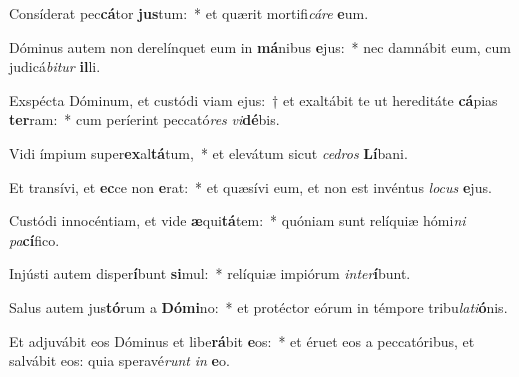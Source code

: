\item Consíderat pec\textbf{cá}tor \textbf{jus}tum:~* et quærit mortifi\textit{cá}\textit{re} \textbf{e}um.
\item Dóminus autem non derelínquet eum in \textbf{má}nibus \textbf{e}jus:~* nec damnábit eum, cum judicá\textit{bi}\textit{tur} \textbf{il}li.
\item Exspécta Dóminum, et custódi viam ejus:~† et exaltábit te ut hereditáte \textbf{cá}pias \textbf{ter}ram:~* cum períerint peccató\textit{res} \textit{vi}\textbf{dé}bis.
\item Vidi ímpium super\textbf{ex}al\textbf{tá}tum,~* et elevátum sicut \textit{ce}\textit{dros} \textbf{Lí}bani.
\item Et transívi, et \textbf{ec}ce non \textbf{e}rat:~* et quæsívi eum, et non est invéntus \textit{lo}\textit{cus} \textbf{e}jus.
\item Custódi innocéntiam, et vide \textbf{æ}qui\textbf{tá}tem:~* quóniam sunt relíquiæ hómi\textit{ni} \textit{pa}\textbf{cí}fico.
\item Injústi autem disper\textbf{í}bunt \textbf{si}mul:~* relíquiæ impiórum \textit{in}\textit{ter}\textbf{í}bunt.
\item Salus autem jus\textbf{tó}rum a \textbf{Dó}\textbf{mi}no:~* et protéctor eórum in témpore tribu\textit{la}\textit{ti}\textbf{ó}nis.
\item Et adjuvábit eos Dóminus et libe\textbf{rá}bit \textbf{e}os:~* et éruet eos a peccatóribus, et salvábit eos: quia speravé\textit{runt} \textit{in} \textbf{e}o.
